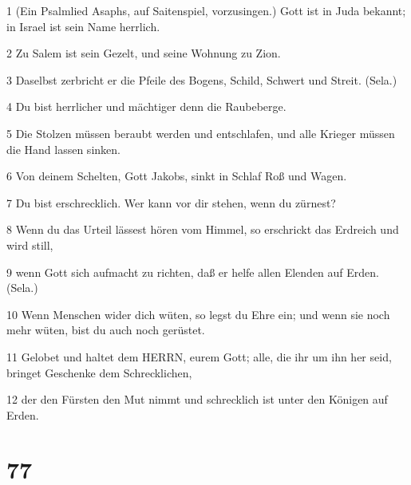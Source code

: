 \par 1 (Ein Psalmlied Asaphs, auf Saitenspiel, vorzusingen.) Gott ist in Juda bekannt; in Israel ist sein Name herrlich.
\par 2 Zu Salem ist sein Gezelt, und seine Wohnung zu Zion.
\par 3 Daselbst zerbricht er die Pfeile des Bogens, Schild, Schwert und Streit. (Sela.)
\par 4 Du bist herrlicher und mächtiger denn die Raubeberge.
\par 5 Die Stolzen müssen beraubt werden und entschlafen, und alle Krieger müssen die Hand lassen sinken.
\par 6 Von deinem Schelten, Gott Jakobs, sinkt in Schlaf Roß und Wagen.
\par 7 Du bist erschrecklich. Wer kann vor dir stehen, wenn du zürnest?
\par 8 Wenn du das Urteil lässest hören vom Himmel, so erschrickt das Erdreich und wird still,
\par 9 wenn Gott sich aufmacht zu richten, daß er helfe allen Elenden auf Erden. (Sela.)
\par 10 Wenn Menschen wider dich wüten, so legst du Ehre ein; und wenn sie noch mehr wüten, bist du auch noch gerüstet.
\par 11 Gelobet und haltet dem HERRN, eurem Gott; alle, die ihr um ihn her seid, bringet Geschenke dem Schrecklichen,
\par 12 der den Fürsten den Mut nimmt und schrecklich ist unter den Königen auf Erden.

\chapter{77}


